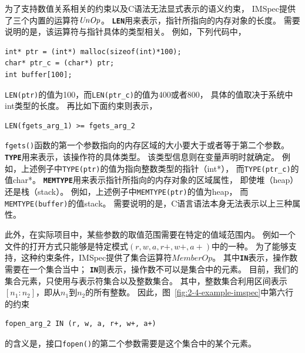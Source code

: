 为了支持数值关系相关的约束以及C语法无法显式表示的语义约束，
IMSpec提供了三个内置的运算符$\mathit{UnOp}$。
\textbf{\texttt{LEN}}用来表示，指针所指向的内存对象的长度。
需要说明的是，该运算符与指针具体的类型相关。
例如，下列代码中，
\begin{lstlisting}[language={[ANSI]C},
basicstyle=\linespread{0.8}\listingsfont,
numbers=none,
xleftmargin=.3\textwidth]
int* ptr = (int*) malloc(sizeof(int)*100);
char* ptr_c = (char*) ptr;
int buffer[100];
\end{lstlisting}
\texttt{LEN(ptr)}的值为100，而\texttt{LEN(ptr\_c)}的值为400或者800，
具体的值取决于系统中int类型的长度。
再比如下面约束则表示，
\begin{lstlisting}[language={[ANSI]C},
basicstyle=\linespread{0.8}\listingsfont,
numbers=none,
xleftmargin=.3\textwidth]
LEN(fgets_arg_1) >= fgets_arg_2
\end{lstlisting}
\texttt{fgets()}函数的第一个参数指向的内存区域的大小要大于或者等于第二个参数。
\textbf{\texttt{TYPE}}用来表示，该操作符的具体类型。
该类型信息则在变量声明时就确定。
例如，上述例子中\texttt{TYPE(ptr)}的值为指向整数类型的指针（int*），
而\texttt{TYPE(ptr\_c)}的值char*。
\textbf{\texttt{MEMTYPE}}用来表示指针所指向的内存对象的区域属性，
即使堆（heap）还是栈（stack）。
例如，上述例子中\texttt{MEMTYPE(ptr)}的值为heap，
而\texttt{MEMTYPE(buffer)}的值stack。
需要说明的是，C语言语法本身无法表示以上三种属性。

此外，在实际项目中，某些参数的取值范围需要在特定的值域范围内。
例如一个文件的打开方式只能够是特定模式$(r, w, a, r+, w+, a+)$中的一种。
为了能够支持，这种约束条件，IMSpec提供了集合运算符$\mathit{MemberOp}$。
其中\texttt{\textbf{IN}}表示，操作数需要在一个集合当中；
\texttt{\textbf{IN}}则表示，操作数不可以是集合中的元素。
目前，我们的集合元素，只使用与表示符集合以及整数集合。
其中，整数集合利用区间表示$[n_1:n_2]$，即从$n_1$到$n_2$的所有整数。
因此，图~\ref{fig:2-4-example-imspec}中第六行的约束
\begin{lstlisting}[language={[ANSI]C},
basicstyle=\linespread{0.8}\listingsfont,
numbers=none,
xleftmargin=.3\textwidth]
fopen_arg_2 IN (r, w, a, r+, w+, a+)
\end{lstlisting}
的含义是，接口\texttt{fopen()}的第二个参数需要是这个集合中的某个元素。



